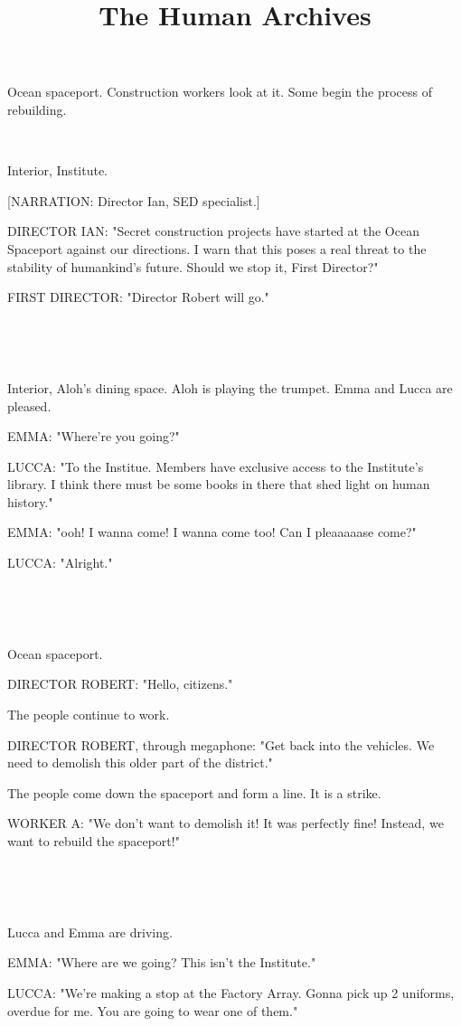 \documentclass[11pt]{article}
\begin{document}
\ttfamily
\title{The Human Archives}
\maketitle

Ocean spaceport.
Construction workers look at it.
Some begin the process of rebuilding.

\ 

Interior, Institute.

[NARRATION: Director Ian, SED specialist.]

DIRECTOR IAN: "Secret construction projects have started at the Ocean Spaceport against our directions. 
I warn that this poses a real threat to the stability of humankind's future.
Should we stop it, First Director?"

FIRST DIRECTOR: "Director Robert will go."

\ 

\ 

Interior, Aloh's dining space.
Aloh is playing the trumpet.
Emma and Lucca are pleased.

EMMA: "Where're you going?"

LUCCA: "To the Institue.
Members have exclusive access to the Institute's library.
I think there must be some books in there that shed light on human history."

EMMA: "ooh! I wanna come! I wanna come too! Can I pleaaaaase come?"

LUCCA: "Alright."

\ 

\ 

Ocean spaceport.

DIRECTOR ROBERT: "Hello, citizens."

The people continue to work.

DIRECTOR ROBERT, through megaphone: "Get back into the vehicles.
We need to demolish this older part of the district."

The people come down the spaceport and form a line.
It is a strike.

WORKER A: "We don't want to demolish it! It was perfectly fine!
Instead, we want to rebuild the spaceport!"

\ 

\ 

Lucca and Emma are driving.

EMMA: "Where are we going? This isn't the Institute."

LUCCA: "We're making a stop at the Factory Array.
Gonna pick up 2 uniforms, overdue for me.
You are going to wear one of them."
\end{document}
